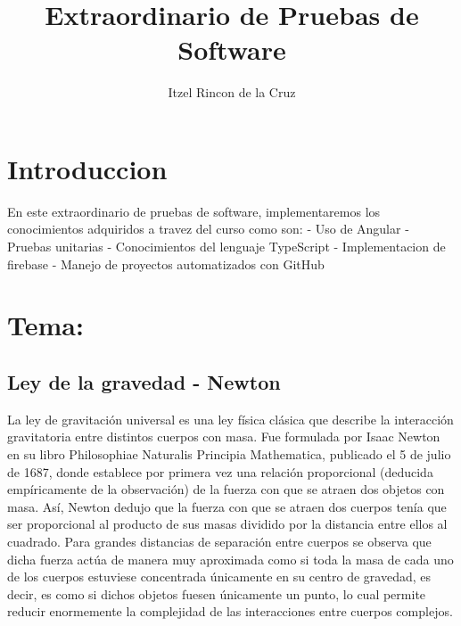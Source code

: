 \documentclass{article}
\title{Extraordinario de Pruebas de Software}
\author{Itzel Rincon de la Cruz}
\begin{document}
\maketitle
\section{Introduccion}

En este extraordinario de pruebas de software, implementaremos los conocimientos adquiridos a travez del curso como son:
- Uso de Angular
- Pruebas unitarias
- Conocimientos del lenguaje TypeScript
- Implementacion de firebase
- Manejo de proyectos automatizados con GitHub

\section{Tema:}
\subsection{Ley de la gravedad - Newton}
La ley de gravitación universal es una ley física clásica que describe la interacción gravitatoria entre distintos cuerpos con masa. Fue formulada por Isaac Newton en su libro Philosophiae Naturalis Principia Mathematica, publicado el 5 de julio de 1687, donde establece por primera vez una relación proporcional (deducida empíricamente de la observación) de la fuerza con que se atraen dos objetos con masa. Así, Newton dedujo que la fuerza con que se atraen dos cuerpos tenía que ser proporcional al producto de sus masas dividido por la distancia entre ellos al cuadrado. Para grandes distancias de separación entre cuerpos se observa que dicha fuerza actúa de manera muy aproximada como si toda la masa de cada uno de los cuerpos estuviese concentrada únicamente en su centro de gravedad, es decir, es como si dichos objetos fuesen únicamente un punto, lo cual permite reducir enormemente la complejidad de las interacciones entre cuerpos complejos.
\end{document}

